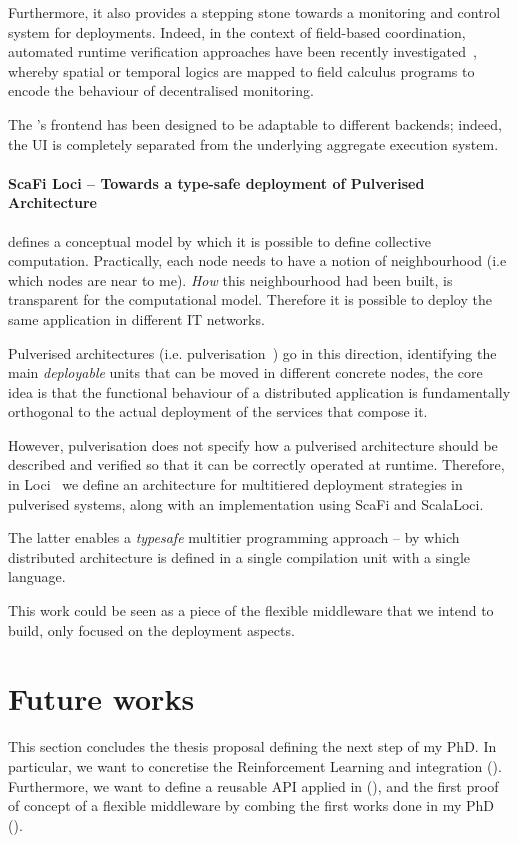 \documentclass[11pt]{article}
\begin{document}
Furthermore, it also provides a stepping stone towards a monitoring and control system for \ac{} deployments.
Indeed, in the context of field-based coordination, automated runtime verification approaches have been recently investigated~\cite{DBLP:journals/jss/AudritoCDSV21}, whereby spatial or temporal logics are mapped to field calculus programs to encode the behaviour of decentralised monitoring.

The \scafiweb{}'s frontend has been designed to be adaptable to different backends; indeed, the UI is completely separated from the underlying aggregate execution system. 

\paragraph{ScaFi Loci -- Towards a type-safe deployment of Pulverised Architecture}
\ac{} defines a conceptual model by which it is possible to define collective computation. Practically, each node needs to have a notion of neighbourhood (i.e which nodes are near to me). \textit{How} this neighbourhood had been built, is transparent for the computational model. Therefore it is possible to deploy the same application in different IT networks.

Pulverised architectures (i.e. pulverisation~\cite{DBLP:journals/fi/CasadeiPPVW20}) go in this direction, identifying the main \textit{deployable} units that can be moved in different concrete nodes, the core idea is that the functional behaviour of a distributed application is fundamentally orthogonal to the actual deployment of the services that compose it.

However, pulverisation does not specify how a pulverised architecture should
be described and verified so that it can be correctly operated at runtime.
Therefore, in \scafi{} Loci~\cite{DBLP:conf/acsos/AguzziCPSV21} we define an architecture for multitiered deployment strategies in pulverised systems, along with an implementation using ScaFi and ScalaLoci.

The latter enables a \textit{typesafe} multitier programming approach -- by which distributed architecture is defined
in a single compilation unit with a single language.

This work could be seen as a piece of the flexible middleware that we intend to build, only focused on the deployment aspects.

\section{Future works}\label{future}
This section concludes the thesis proposal defining the next step of my PhD. In particular, we want to concretise the Reinforcement Learning and \acfull{} integration (). Furthermore, we want to define a reusable API applied in \cpsw{}(), and the first proof of concept of a flexible middleware by combing the first works done in my PhD (). 
\end{document}
